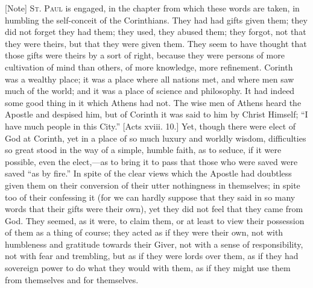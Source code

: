 [Note] S\textsc{t}.
P\textsc{aul} is engaged, in
the chapter from which these words are taken, in humbling the
self-conceit of the Corinthians. They had had gifts given them; they
did not forget they had them; they used, they abused them; they
forgot, not that they were theirs, but that they were given them. They
seem to have thought that those gifts were theirs by a sort of right,
because they were persons of more cultivation of mind than others, of
more knowledge, more refinement. Corinth was a wealthy place; it was a
place where all nations met, and where men saw much of the world; and
it was a place of science and philosophy. It had indeed some good
thing in it which Athens had not. The wise men of Athens heard the
Apostle and despised him, but of Corinth it was said to him by Christ
Himself; ``I have much people in this City.'' [Acts xviii.
10.] Yet, though there were elect of God at Corinth, yet in a place of
so much luxury and worldly wisdom, difficulties so great stood in the
way of a simple, humble faith, as to seduce, if it were possible, even
the elect,—as to bring it to pass that those who were saved were
saved ``as by fire.'' In spite of the clear views which the
Apostle had doubtless given them on their conversion of their utter
nothingness in themselves; in spite too of their confessing it (for we
can hardly suppose that they said in so many words that their gifts
were their own), yet they did not feel that they came from God. They
seemed, as it were, to claim them, or at least to view their
possession of them as a thing of course; they acted as if they were
their own, not with humbleness and gratitude towards their Giver, not
with a sense of responsibility, not with fear and trembling, but as if
they were lords over them, as if they had sovereign power to do what
they would with them, as if they might use them from themselves and
for themselves.

